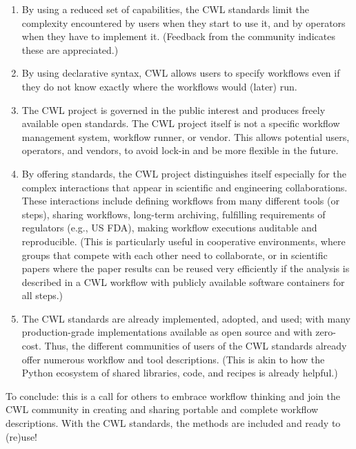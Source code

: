 \documentclass[
]{article}
\providecommand{\tightlist}{%
  \setlength{\itemsep}{0pt}\setlength{\parskip}{0pt}}
\begin{document}
\begin{enumerate}
\def\labelenumi{(\arabic{enumi})}
\tightlist
\item
  By using a reduced set of capabilities, the CWL standards limit the
  complexity encountered by users when they start to use it, and by
  operators when they have to implement it. (Feedback from the community
  indicates these are appreciated.)\\
\item
  By using declarative syntax, CWL allows users to specify workflows
  even if they do not know exactly where the workflows would (later)
  run.\\
\item
  The CWL project is governed in the public interest and produces freely
  available open standards. The CWL project itself is not a specific
  workflow management system, workflow runner, or vendor. This allows
  potential users, operators, and vendors, to avoid lock-in and be more
  flexible in the future.\\
\item
  By offering standards, the CWL project distinguishes itself especially
  for the complex interactions that appear in scientific and engineering
  collaborations. These interactions include defining workflows from
  many different tools (or steps), sharing workflows, long-term
  archiving, fulfilling requirements of regulators (e.g., US FDA),
  making workflow executions auditable and reproducible. (This is
  particularly useful in cooperative environments, where groups that
  compete with each other need to collaborate, or in scientific papers
  where the paper results can be reused very efficiently if the analysis
  is described in a CWL workflow with publicly available software
  containers for all steps.)\\
\item
  The CWL standards are already implemented, adopted, and used; with
  many production-grade implementations available as open source and
  with zero-cost. Thus, the different communities of users of the CWL
  standards already offer numerous workflow and tool descriptions. (This
  is akin to how the Python ecosystem of shared libraries, code, and
  recipes is already helpful.)
\end{enumerate}

To conclude: this is a call for others to embrace workflow thinking and
join the CWL community in creating and sharing portable and complete
workflow descriptions. With the CWL standards, the methods are included
and ready to (re)use!
\end{document}
